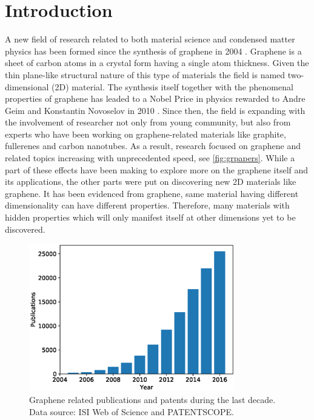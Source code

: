 
\chapter{Introduction \label{chap:1}}  %

\ifpdf
    \graphicspath{{Chapter1/Figs/Raster/}{Chapter1/Figs/PDF/}{Chapter1/Figs/}{Chapter1/Figs/Vector/}}
\else
    \graphicspath{{Chapter1/Figs/Vector/}{Chapter1/Figs/}}
\fi


A new field of research related to both material science and condensed matter physics has been formed since the synthesis of graphene in 2004 \cite{Novoselov666,Novoselov26072005}. Graphene is a sheet of carbon atoms in a crystal form having a single atom thickness. Given the thin plane-like structural nature of this type of materials the field is named two-dimensional (2D) material. The synthesis itself together with the phenomenal properties of graphene has leaded to a Nobel Price in physics rewarded to Andre Geim and Konstantin Novoselov in 2010 \cite{Geim2007}. Since then, the field is expanding with the involvement of researcher not only from young community, but also from experts who have been working on graphene-related materials like graphite, fullerenes and carbon nanotubes. As a result, research focused on graphene and related topics increasing with unprecedented speed, see \autoref{fig:grpapers}. While a part of these effects have been making to explore more on the graphene itself and its applications, the other parts were put on discovering new 2D materials like graphene. It has been evidenced from graphene, same material having different dimensionality can have different properties. Therefore, many materials with hidden properties which will only manifest itself at other dimensions yet to be discovered. 


\begin{figure}[htbp!] 
\centering  
\includegraphics[width=0.8\textwidth]{graphene_papers.eps}
\caption[Graphene publications]{Graphene related publications and patents during the last decade. Data source: ISI Web of Science and PATENTSCOPE. \protect\footnotemark }  
\label{fig:grpapers}
\end{figure} 

